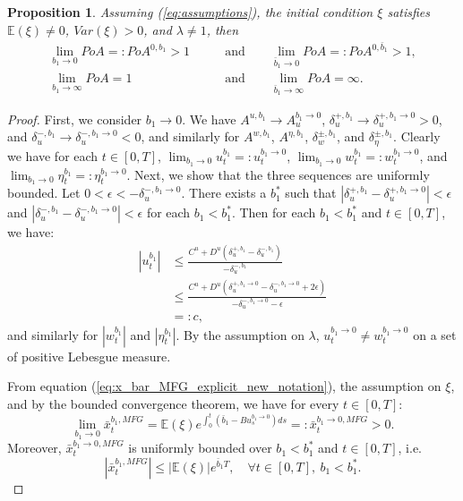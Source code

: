 \documentclass[11pt]{article}
\newtheorem{proposition}{Proposition}
\begin{document}
\begin{proposition}\label{prop:b1_b1bar}
	Assuming (\ref{eq:assumptions}), the initial condition $\xi$ satisfies $\mathbb{E}(\xi)\neq 0$, $Var(\xi)>0$, and $\lambda \neq 1$, then
	\begin{equation*}
	\begin{split}
	    \lim_{b_1 \to 0} PoA =: PoA^{0,b_1} > 1\qquad &\text{and} \qquad \lim_{\bar{b}_1 \to 0} PoA =: PoA^{0,\bar{b}_1} > 1,\\
	    \lim_{b_1 \to \infty} PoA = 1 \qquad &\text{and} \qquad\lim_{\bar{b}_1 \to \infty} PoA =\infty.
	\end{split}
	\end{equation*}
\end{proposition}
\begin{proof}
	First, we consider $b_1 \to 0$. We have $A^{u,b_1} \to A^{b_1\to 0}_u$, $\delta^{+,b_1}_u \to \delta^{+,b_1\to 0}_u>0$, and $\delta^{-,b_1}_u \to \delta^{-,b_1\to 0}_u<0$, and similarly for $A^{w,b_1}$, $A^{\eta,b_1}$, $\delta^{\pm,b_1}_w$, and $\delta^{\pm,b_1}_\eta$. Clearly we have for each $t\in[0,T]$, $\lim_{b_1 \to 0}u^{b_1}_t=:u^{b_1\to 0}_t$, $\lim_{b_1 \to 0}w^{b_1}_t=:w^{b_1 \to 0}_t$, and $\lim_{b_1 \to 0}\eta^{b_1}_t=:\eta^{b_1 \to 0}_t$. Next, we show that the three sequences are uniformly bounded. Let $0<\epsilon<-\delta^{-,b_1\to 0}_u$. There exists a $b_1^*$ such that $\left| \delta^{+,b_1}_u-\delta^{+,b_1\to0}_u \right|<\epsilon$ and $\left| \delta^{-,b_1}_u-\delta^{-,b_1\to0}_u \right|<\epsilon$ for each $b_1<b_1^*$. Then for each $b_1<b_1^*$ and $t\in[0,T]$, we have:
	\begin{equation*}
	\begin{split}
		\left|u^{b_1}_t\right| &\leq \frac{C^u+D^u\left(\delta^{+,b_1}_u-\delta^{-,b_1}_u\right) }{-\delta^{-,b_1}_u} \\
		&\leq \frac{C^u+D^u\left(\delta^{+,b_1\to 0}_u-\delta^{-,b_1 \to 0}_u+2\epsilon\right) }{-\delta^{-,b_1\to 0}_u-\epsilon}\\
		&=:c,
	\end{split}
	\end{equation*}
	and similarly for $\left|w^{b_1}_t\right|$ and $\left|\eta^{b_1}_t\right|$. By the assumption on $\lambda$, $u^{b_1\to 0}_t \neq w^{b_1\to 0}_t$ on a set of positive Lebesgue measure.
	
	From equation (\ref{eq:x_bar_MFG_explicit_new_notation}), the assumption on $\xi$, and by the bounded convergence theorem, we have for every $t \in [0,T]$:
	\begin{equation*}
	\lim_{b_1\to 0}\bar{x}_t^{b_1,MFG} = \mathbb{E}(\xi) e^{\int_0^t(\bar{b}_1-B u^{b_1\to 0}_s)ds} =: \bar{x}_t^{b_1\to 0,MFG}>0.
	\end{equation*}
	Moreover, $\bar{x}_t^{b_1\to 0,MFG}$ is uniformly bounded over $b_1<b_1^*$ and $t \in [0,T]$, i.e. 
	$$ \left| \bar{x}^{b_1,MFG}_t \right| \leq \vert \mathbb{E}(\xi) \vert e^{ \bar{b}_1 T }, \quad \forall t \in [0,T],\ b_1<b_1^*. $$ 
	

\end{proof}
\end{document}
